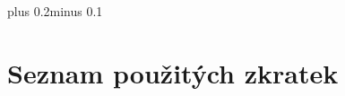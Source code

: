 \documentclass[11pt,oneside,a4paper]{book}
\begin{document}

\listoffigures


\listoftables





\mainbodystarts
\normalfont
{}\baselineskip plus 0.2\baselineskip minus 0.1\baselineskip











{
	\def\CS{$\cal C\kern-0.1667em\lower.5ex\hbox{$\cal S$}\kern-0.075em $}
	
}


\appendix

\chapter{Seznam použitých zkratek}
\end{document}
